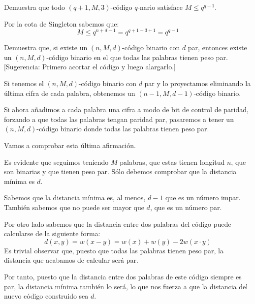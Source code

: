 \begin{problem}[4] Demuestra que todo $(q+1,M,3)$-código $q$-nario satisface
$M\le q^{q-1}$.
\solution


Por la cota de Singleton sabemos que:
\[M \leq q^{n+d-1} = q^{q+1-3+1} = q^{q-1}\]
\end{problem}


\begin{problem}[5]  Demuestra que, si existe un $(n,M,d)$-código binario con
$d$ par, entonces existe un $(n,M,d)$-código binario en el que
todas las palabras tienen peso par. [Sugerencia: Primero acortar
el código y luego alargarlo.]
\solution


Si tenemos el $(n,M,d)$-código binario con $d$ par y lo proyectamos eliminando la última cifra de cada palabra, obtenemos un $(n-1,M,d-1)$-código binario.

Si ahora añadimos a cada palabra una cifra a modo de bit de control de paridad, forzando a que todas las palabras tengan paridad par, pasaremos a tener un $(n,M,d)$-código binario donde todas las palabras tienen peso par.

Vamos a comprobar esta última afirmación.

Es evidente que seguimos teniendo $M$ palabras, que estas tienen longitud $n$, que son binarias y que tienen peso par. Sólo debemos comprobar que la distancia mínima es $d$.

Sabemos que la distancia mínima es, al menos, $d-1$ que es un número impar. También sabemos que no puede ser mayor que $d$, que es un número par.

Por otro lado sabemos que la distancia entre dos palabras del código puede calcularse de la siguiente forma:
\[d(x,y)=w(x-y)=w(x)+w(y) - 2 w(x\cdot y)\]
Es trivial observar que, puesto que todas las palabras tienen peso par, la distancia que acabamos de calcular será par.

Por tanto, puesto que la distancia entre dos palabras de este código siempre es par, la distancia mínima también lo será, lo que nos fuerza a que la distancia del nuevo código construido sea $d$.
\end{problem}


